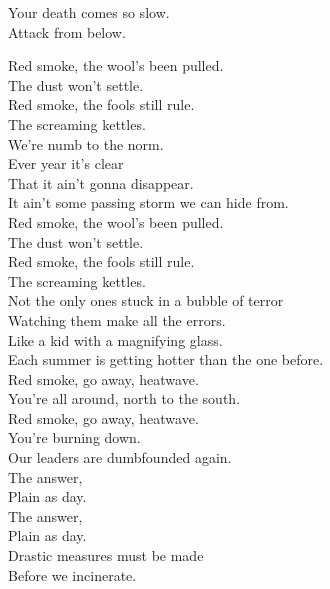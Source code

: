 Your death comes so slow. \\
Attack from below. \\





Red smoke, the wool's been pulled. \\
The dust won't settle. \\
Red smoke, the fools still rule. \\
The screaming kettles. \\

We're numb to the norm. \\
Ever year it's clear \\
That it ain't gonna disappear. \\
It ain't some passing storm we can hide from. \\

Red smoke, the wool's been pulled. \\
The dust won't settle. \\
Red smoke, the fools still rule. \\
The screaming kettles. \\

Not the only ones stuck in a bubble of terror \\
Watching them make all the errors. \\
Like a kid with a magnifying glass. \\
Each summer is getting hotter than the one before. \\

Red smoke, go away, heatwave. \\
You're all around, north to the south. \\
Red smoke, go away, heatwave. \\
You're burning down. \\
Our leaders are dumbfounded again. \\

The answer, \\
Plain as day. \\
The answer, \\
Plain as day. \\
Drastic measures must be made \\
Before we incinerate. \\

